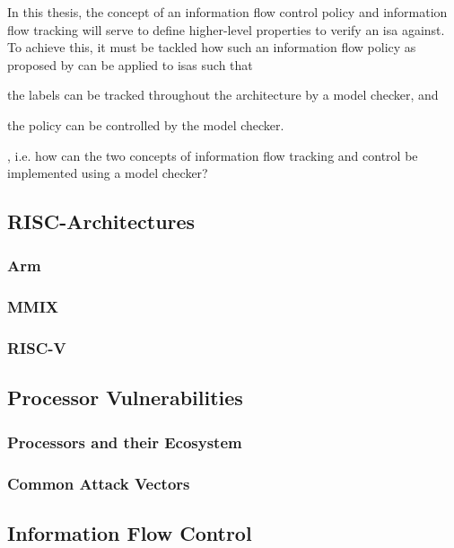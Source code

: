 In this thesis, the concept of an information flow control policy and information flow tracking will serve to define higher-level properties to verify an \gls{isa} against.
To achieve this, it must be tackled how such an information flow policy as proposed by \citeauthor{Ferraiuolo17} can be applied to \glspl{isa} such that \begin{enumerate*}[label=\alph*)]
    \item the labels can be tracked throughout the architecture by a model checker, and
    \item the policy can be controlled by the model checker.
\end{enumerate*}, i.e. how can the two concepts of information flow tracking and control be implemented using a model checker?

\subsection{RISC-Architectures}

\subsubsection{Arm}

\subsubsection{MMIX}

\subsubsection{RISC-V}

\subsection{Processor Vulnerabilities}

\subsubsection{Processors and their Ecosystem}

\subsubsection{Common Attack Vectors}

\subsection{Information Flow Control}

